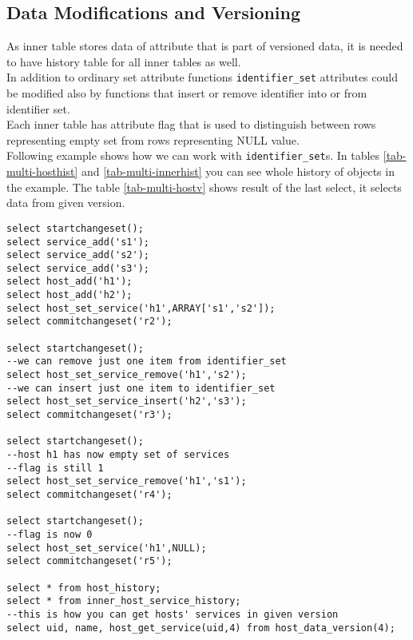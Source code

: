 \documentclass[deska]{subfiles}
\begin{document}
\subsection{Data Modifications and Versioning}
As inner table stores data of attribute that is part of versioned data, it is needed to have history table for all inner tables as well.\\ 
In addition to ordinary set attribute functions {\tt identifier\_set} attributes could be modified also by functions that insert or remove identifier into or from identifier set.\\
Each inner table has attribute flag that is used to distinguish between rows representing empty set from rows representing NULL value.\\
Following example shows how we can work with {\tt identifier\_set}s. In tables \ref{tab-multi-hosthist} and \ref{tab-multi-innerhist} you can see whole history of objects in the example. The table \ref{tab-multi-hostv} shows result of the last select, it selects data from given version.

\begin{verbatim}
select startchangeset();
select service_add('s1');
select service_add('s2');
select service_add('s3');
select host_add('h1');
select host_add('h2');
select host_set_service('h1',ARRAY['s1','s2']);
select commitchangeset('r2');

select startchangeset();
--we can remove just one item from identifier_set
select host_set_service_remove('h1','s2');
--we can insert just one item to identifier_set
select host_set_service_insert('h2','s3');
select commitchangeset('r3');

select startchangeset();
--host h1 has now empty set of services
--flag is still 1
select host_set_service_remove('h1','s1');
select commitchangeset('r4');

select startchangeset();
--flag is now 0
select host_set_service('h1',NULL);
select commitchangeset('r5');

select * from host_history;
select * from inner_host_service_history;
--this is how you can get hosts' services in given version
select uid, name, host_get_service(uid,4) from host_data_version(4);
\end{verbatim}
\end{document}
